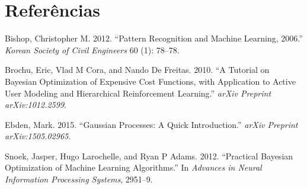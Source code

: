 \documentclass[
	12pt,				%
	openright,			%
	twoside,			%
	a4paper,			%
	english,			%
	french,				%
	spanish,			%
	brazil,				%
]{abntex2}
\begin{document}
\newpage

\hypertarget{referuxeancias}{%
\chapter*{Referências}\label{referuxeancias}}

\hypertarget{refs}{}
\leavevmode\hypertarget{ref-bishop2012pattern}{}%
Bishop, Christopher M. 2012. ``Pattern Recognition and Machine Learning,
2006.'' \emph{Korean Society of Civil Engineers} 60 (1): 78--78.

\leavevmode\hypertarget{ref-brochu2010tutorial}{}%
Brochu, Eric, Vlad M Cora, and Nando De Freitas. 2010. ``A Tutorial on
Bayesian Optimization of Expensive Cost Functions, with Application to
Active User Modeling and Hierarchical Reinforcement Learning.''
\emph{arXiv Preprint arXiv:1012.2599}.

\leavevmode\hypertarget{ref-ebden2015gaussian}{}%
Ebden, Mark. 2015. ``Gaussian Processes: A Quick Introduction.''
\emph{arXiv Preprint arXiv:1505.02965}.

\leavevmode\hypertarget{ref-snoek2012practical}{}%
Snoek, Jasper, Hugo Larochelle, and Ryan P Adams. 2012. ``Practical
Bayesian Optimization of Machine Learning Algorithms.'' In
\emph{Advances in Neural Information Processing Systems}, 2951--9.

\postextual




\printindex
\end{document}
